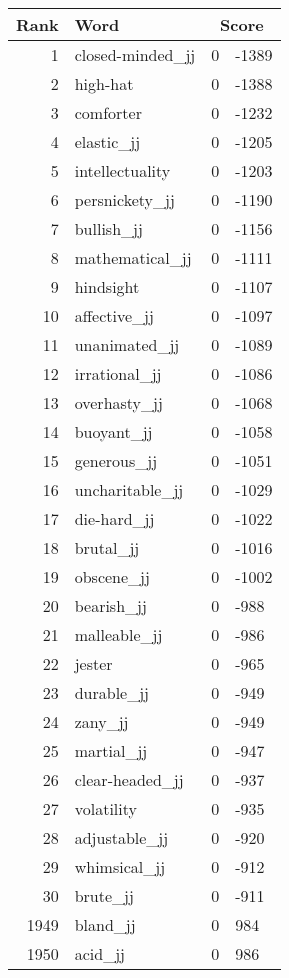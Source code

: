 \begin{longtable}[!htbp]{| rlr@{.}l |}
    \hline
    \textbf{Rank} & \textbf{Word} & \multicolumn{2}{c|}{\textbf{Score}} \\
    \hline
    \endhead
    1 & closed-minded\_jj & 0 & -1389 \\
    2 & high-hat & 0 & -1388 \\
    3 & comforter & 0 & -1232 \\
    4 & elastic\_jj & 0 & -1205 \\
    5 & intellectuality & 0 & -1203 \\
    6 & persnickety\_jj & 0 & -1190 \\
    7 & bullish\_jj & 0 & -1156 \\
    8 & mathematical\_jj & 0 & -1111 \\
    9 & hindsight & 0 & -1107 \\
    10 & affective\_jj & 0 & -1097 \\
    11 & unanimated\_jj & 0 & -1089 \\
    12 & irrational\_jj & 0 & -1086 \\
    13 & overhasty\_jj & 0 & -1068 \\
    14 & buoyant\_jj & 0 & -1058 \\
    15 & generous\_jj & 0 & -1051 \\
    16 & uncharitable\_jj & 0 & -1029 \\
    17 & die-hard\_jj & 0 & -1022 \\
    18 & brutal\_jj & 0 & -1016 \\
    19 & obscene\_jj & 0 & -1002 \\
    20 & bearish\_jj & 0 & -988 \\
    21 & malleable\_jj & 0 & -986 \\
    22 & jester & 0 & -965 \\
    23 & durable\_jj & 0 & -949 \\
    24 & zany\_jj & 0 & -949 \\
    25 & martial\_jj & 0 & -947 \\
    26 & clear-headed\_jj & 0 & -937 \\
    27 & volatility & 0 & -935 \\
    28 & adjustable\_jj & 0 & -920 \\
    29 & whimsical\_jj & 0 & -912 \\
    30 & brute\_jj & 0 & -911 \\
    1949 & bland\_jj & 0 & 984 \\
    1950 & acid\_jj & 0 & 986 \\

\end{longtable}
